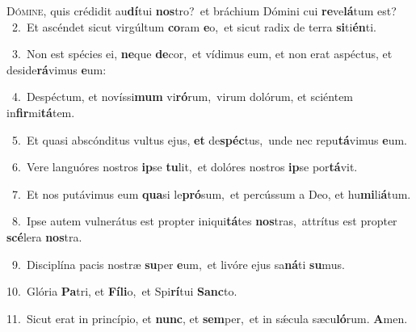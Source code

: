 \lettrine{\initial\textcolor{\initialcolor}{D}}{ómine,} quis crédidit au\-\textbf{dí}\-tui \textbf{nos}\-tro?~\star et bráchium Dómini cui \textbf{re}\-ve\-\textbf{lá}\-tum est?\\
{\numbfont\textcolor{\numbcolor}{~2.}}~Et ascéndet sicut virgúltum \textbf{co}\-ram \textbf{e}\-o,~\star et sicut radix de terra \textbf{si}\-ti\-\textbf{én}\-ti.\par
{\numbfont\textcolor{\numbcolor}{~3.}}~Non est spécies ei, \textbf{ne}\-que \textbf{de}\-cor,~\star et vídimus eum, et non erat aspéctus, et deside\-\textbf{rá}\-vimus \textbf{e}\-um:\par
{\numbfont\textcolor{\numbcolor}{~4.}}~Despéctum, et novíssi\textbf{mum} vi\-\textbf{ró}\-rum,~\star virum dolórum, et sciéntem in\-\textbf{fir}\-mi\-\textbf{tá}\-tem.\par
{\numbfont\textcolor{\numbcolor}{~5.}}~Et quasi abscónditus vultus ejus, \textbf{et} de\-\textbf{spéc}\-tus,~\star unde nec repu\-\textbf{tá}\-vimus \textbf{e}\-um.\par
{\numbfont\textcolor{\numbcolor}{~6.}}~Vere languóres nostros \textbf{ip}\-se \textbf{tu}\-lit,~\star et dolóres nostros \textbf{ip}\-se por\-\textbf{tá}\-vit.\par
{\numbfont\textcolor{\numbcolor}{~7.}}~Et nos putávimus eum \textbf{qua}\-si le\-\textbf{pró}\-sum,~\star et percússum a Deo, et hu\-\textbf{mi}\-li\-\textbf{á}\-tum.\par
{\numbfont\textcolor{\numbcolor}{~8.}}~Ipse autem vulnerátus est propter iniqui\-\textbf{tá}\-tes \textbf{nos}\-tras,~\star attrítus est propter \textbf{scé}\-lera \textbf{nos}\-tra.\par
{\numbfont\textcolor{\numbcolor}{~9.}}~Disciplína pacis nostræ \textbf{su}\-per \textbf{e}\-um,~\star et livóre ejus sa\-\textbf{ná}\-ti \textbf{su}\-mus.\par
{\numbfont\textcolor{\numbcolor}{10.}}~Glória \textbf{Pa}\-tri, et \textbf{Fí}\-\textbf{li}o,~\star et Spi\-\textbf{rí}\-tui \textbf{Sanc}\-to.\par
{\numbfont\textcolor{\numbcolor}{11.}}~Sicut erat in princípio, et \textbf{nunc}\-, et \textbf{sem}\-per,~\star et in sǽcula sæcu\-\textbf{ló}\-rum. \textbf{A}\-men.\par
